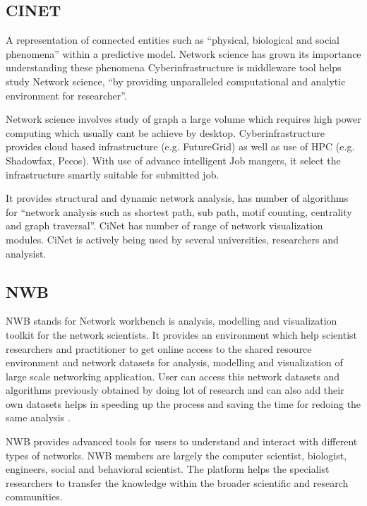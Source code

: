  \pv

\subsection{CINET}

    A representation of connected entities such as ``physical,
    biological and social phenomena'' within a predictive
    model\cite{www-bi-vt-edu}. Network science has grown its importance understanding
    these phenomena Cyberinfrastructure is middleware tool helps study
    Network science,
    ``by providing unparalleled computational and analytic environment
    for researcher''\cite{www-portal-futuresystems-org-projects-233}.
 
    Network science involves study of graph a large volume which
    requires high power computing which usually cant be achieve by
    desktop. Cyberinfrastructure provides cloud based infrastructure
    (e.g. FutureGrid) as well as use of HPC (e.g. Shadowfax,
    Pecos). With use of advance intelligent Job mangers, it select the
    infrastructure smartly suitable for submitted job.
     
    It provides structural and dynamic network analysis, has number of
    algorithms for ``network analysis such as shortest path, sub path,
    motif counting, centrality and graph traversal''. CiNet has number
    of range of network visualization modules.  CiNet is actively
    being used by several universities, researchers and analysist.

    \pv

\subsection{NWB}

    NWB stands for Network workbench is analysis,
    modelling and visualization toolkit for the network scientists.
    It provides an environment which help scientist researchers and
    practitioner to get online access to the shared resource
    environment and network datasets for analysis, modelling and
    visualization of large scale networking application.  User can
    access this network datasets and algorithms previously obtained by
    doing lot of research and can also add their own datasets helps in
    speeding up the process and saving the time for redoing the same
    analysis \cite{www-nwb.edu}.

    NWB provides advanced tools for users to understand and interact
    with different types of networks.  NWB members are largely the
    computer scientist, biologist, engineers, social and behavioral
    scientist. The platform helps the specialist researchers to
    transfer the knowledge within the broader scientific and research
    communities.

